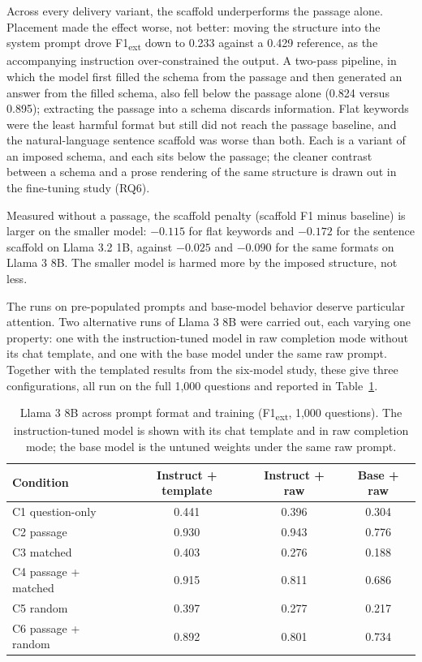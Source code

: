 \documentclass[master]{thesis}
\begin{document}
Across every delivery variant, the scaffold underperforms the passage alone. Placement made the effect worse, not better: moving the structure into the system prompt drove F1\textsubscript{ext} down to 0.233 against a 0.429 reference, as the accompanying instruction over-constrained the output. A two-pass pipeline, in which the model first filled the schema from the passage and then generated an answer from the filled schema, also fell below the passage alone (0.824 versus 0.895); extracting the passage into a schema discards information. Flat keywords were the least harmful format but still did not reach the passage baseline, and the natural-language sentence scaffold was worse than both. Each is a variant of an imposed schema, and each sits below the passage; the cleaner contrast between a schema and a prose rendering of the same structure is drawn out in the fine-tuning study (RQ6).

Measured without a passage, the scaffold penalty (scaffold F1 minus baseline) is larger on the smaller model: $-0.115$ for flat keywords and $-0.172$ for the sentence scaffold on Llama 3.2 1B, against $-0.025$ and $-0.090$ for the same formats on Llama 3 8B. The smaller model is harmed more by the imposed structure, not less.

The runs on pre-populated prompts and base-model behavior deserve particular attention. Two alternative runs of Llama 3 8B were carried out, each varying one property: one with the instruction-tuned model in raw completion mode without its chat template, and one with the base model under the same raw prompt. Together with the templated results from the six-model study, these give three configurations, all run on the full 1,000 questions and reported in Table~\ref{tab:rawtuning}.

\begin{table}[h]
\centering
\begin{tabular}{lccc}
\toprule
Condition & Instruct + template & Instruct + raw & Base + raw \\
\midrule
C1 question-only    & 0.441 & 0.396 & 0.304 \\
C2 passage          & 0.930 & 0.943 & 0.776 \\
C3 matched          & 0.403 & 0.276 & 0.188 \\
C4 passage + matched & 0.915 & 0.811 & 0.686 \\
C5 random           & 0.397 & 0.277 & 0.217 \\
C6 passage + random & 0.892 & 0.801 & 0.734 \\
\bottomrule
\end{tabular}
\caption{Llama 3 8B across prompt format and training (F1\textsubscript{ext}, 1,000 questions). The instruction-tuned model is shown with its chat template and in raw completion mode; the base model is the untuned weights under the same raw prompt.}
\label{tab:rawtuning}
\end{table}
\end{document}
